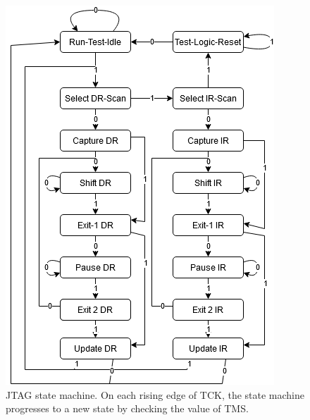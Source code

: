 \documentclass[10pt,a4paper]{article}
\begin{document}
\begin{figure}[H]
\centering
\includegraphics[width= 0.35 \textwidth]{figures/jtagstatemachine.png}
\caption{JTAG state machine. On each rising edge of TCK, the state machine progresses to a new state by checking the value of TMS.}
\label{fig:jtagstatemachine}
\end{figure}
\end{document}
